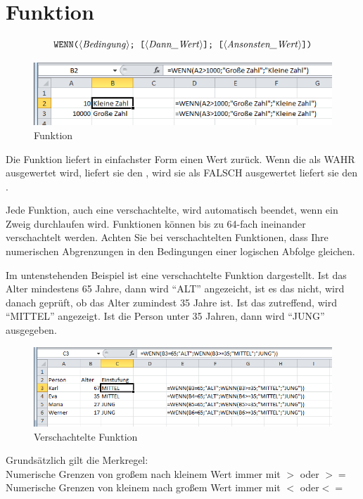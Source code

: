 \pagebreak
\section{ Funktion}

$$ \text{\stmt{WENN(\syntax{Bedingung}; [\syntax{Dann\_Wert}]; [\syntax{Ansonsten\_Wert}])}}$$

	\begin{figure}[H]
		\centering
			\includegraphics[scale=0.7]{images/wenn_1b}
			\caption{ Funktion}
		\label{fig:wenn}
	\end{figure}


Die  Funktion liefert in einfachster Form einen Wert zurück. Wenn die  als WAHR ausgewertet wird, liefert sie den , wird sie als FALSCH ausgewertet liefert sie den .


Jede  Funktion, auch eine verschachtelte, wird automatisch beendet, wenn ein Zweig durchlaufen wird.  Funktionen können bis zu 64-fach ineinander verschachtelt werden. Achten Sie bei verschachtelten  Funktionen, dass Ihre numerischen Abgrenzungen in den Bedingungen einer logischen Abfolge gleichen.

Im untenstehenden Beispiel ist eine verschachtelte  Funktion dargestellt. Ist das Alter mindestens 65 Jahre, dann wird "`ALT"' angezeicht, ist es das nicht, wird danach geprüft, ob das Alter zumindest 35 Jahre ist. Ist das zutreffend, wird "`MITTEL"' angezeigt. Ist die Person unter 35 Jahren, dann wird "`JUNG"' ausgegeben.

	\begin{figure}[H]
		\centering
			\includegraphics[scale=0.7]{images/wenn_verschachtelt_b}
		\caption{Verschachtelte  Funktion}
		\label{fig:wenn_verschachtelt}
	\end{figure}

\begin{lightbulbbox}
Grundsätzlich gilt die Merkregel:\\
Numerische Grenzen von großem nach kleinem Wert immer mit $>$ oder $>=$\\
Numerische Grenzen von kleinem nach großem Wert immer mit $<$ oder$<=$
\end{lightbulbbox}
